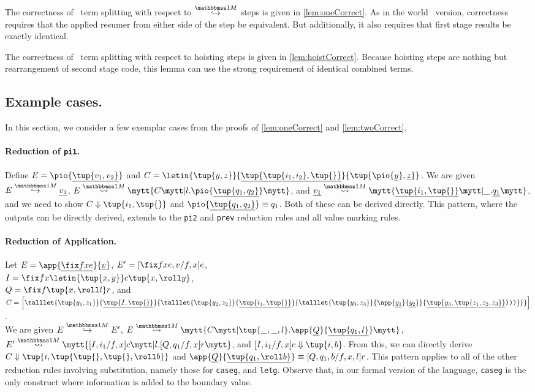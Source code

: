 \begin{abstrsyn}
The correctness of \bbonem\ term splitting with respect to $\stepsym \bbonem$ steps is given in \ref{lem:oneCorrect}.
As in the world \bbtwo\ version, correctness requires that the applied resumer from either side of the step be equivalent.
But additionally, it also requires that first stage results be exactly identical.

The correctness of \bbonem\ term splitting with respect to hoisting steps is given in \ref{lem:hoistCorrect}.
Because hoisting steps are nothing but rearrangement of second stage code,
this lemma can use the strong requirement of identical combined terms.

\subsection{Example cases.}

In this section, we consider a few exemplar cases 
from the proofs of \ref{lem:oneCorrect} and \ref{lem:twoCorrect}.


\paragraph{Reduction of {\tt pi1}.}
Define $E = \pio {\exv{\tup {v_1,v_2}}}$ and  
$C = \letin{\tup{y,z}}{\exv{\tup{\tup {i_1,i_2},\tup{}}}}{\tup{\pio {\exv y},\exv z}}$.
We are given $\stepmix  E {\exv {v_1}}$,
$\splitone E A C {l.\pio {\exv {\tup{q_1,q_2}}}}$, and
$\splitone {\exv {v_1}} A {\exv {\tup{i_1,\tup{}}}} {\_.\exv{q_1}}$,
and we need to show $\reduce C {\tup {i_1,\tup{}}}$
and $\pio {\exv {\tup{q_1,q_2}}} \equiv q_1$.
Both of these can be derived directly.
This pattern, where the outputs can be directly derived, extends to the {\tt pi2} and {\tt prev} reduction rules and all value marking rules.

\paragraph{Reduction of Application.} Let $E = \app {\exv{\fix f x e}} {\exv v}$,
$E' = [\fix fxe, v/f,x] e$, \\ 
$I = \fix f x {\letin {\tup{x,y}} c {\tup{x,\roll y}}}$, \\
$Q = \fix f {\tup{x,\roll l}} r$, and \\
$C = \left[
\talllet{\tup{y_1,z_1}}{\exv {\tup {I,\tup{}}}}{
\talllet{\tup{y_2,z_2}} {\exv {\tup {i_1,\tup{}}}}{
\talllet{\tup{y_3,z_3}}{\app{\exv {y_1}}{\exv {y_2}}}{\exv{\tup{y_3,\tup{z_1,z_2,z_3}}}\ttrpar\ttrpar\ttrpar}}}\right]$.
\\
We are given $\stepmix E {E'}$,
$\splitone E A C {\tup{\_,\_,l}.\app{\exv Q}{\exv{\tup{q_1,l}}}}$,
$\splitone {E'} A {[I,i_1/f,x]c} {l.[Q,q_1/f,x]r}$,
and $\reduce {[I,i_1/f,x]c} {\tup{i,b}}$.
From this, we can directly derive $\reduce C {\tup{i,\tup {\tup{},\tup{},\roll b}}}$
and $\app{\exv Q}{\exv{\tup{q_1,\roll b}}} \equiv [Q,q_1,b/f,x,l] r$.
This pattern applies to all of the other reduction rules involving substitution,
namely those for {\tt caseg}, and {\tt letg}. 
Observe that, in our formal version of the language, 
{\tt caseg} is the only construct where information is added to the boundary value.


\end{abstrsyn}
